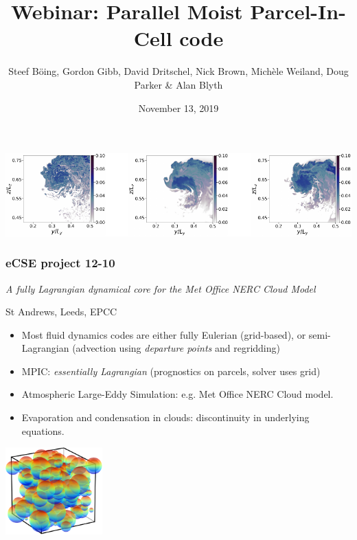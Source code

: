\documentclass{beamer}
\title[MPIC]{Webinar: Parallel Moist Parcel-In-Cell code}
\author[B\"oing, Gibb, Dritschel, et al.]{{Steef B\"oing, Gordon Gibb, David Dritschel, Nick Brown, \newline Mich\`ele Weiland, Doug Parker \& Alan Blyth}\vspace{-0.5cm}}
\institute[]{{University of Leeds, University of St Andrews, EPCC}\vspace{-0.4cm}}
\date{November 13, 2019}
\begin{document}
\begin{frame}

\titlepage %

\vspace{-0.6cm}
\begin{center}
  \includegraphics[width = \textwidth]{pmpic_images/croppedfig_les.pdf}
\end{center}


\end{frame}

\begin{frame}

\tableofcontents
\end{frame}

\begin{frame}
\frametitle{eCSE project 12-10}
\textit{A fully Lagrangian dynamical core for the Met Office NERC Cloud Model}
\vspace{-0.2cm}
\begin{center}
St Andrews, Leeds, EPCC
\end{center}
\vspace{-0.2cm}
\begin{itemize}
\item Most fluid dynamics codes are either fully Eulerian (grid-based), or semi-Lagrangian (advection using \textit{departure points} and regridding)
\item MPIC: \textit{essentially Lagrangian} (prognostics on parcels, solver uses grid)
\item Atmospheric Large-Eddy Simulation: e.g. Met Office NERC Cloud model. 
\item Evaporation and condensation in clouds: discontinuity in underlying equations.
\end{itemize}
\vspace{-0.8cm}

\begin{center}
  \includegraphics[width = 0.28\textwidth]{pmpic_images/parcels.pdf}
\end{center}

\end{frame}
\end{document}
